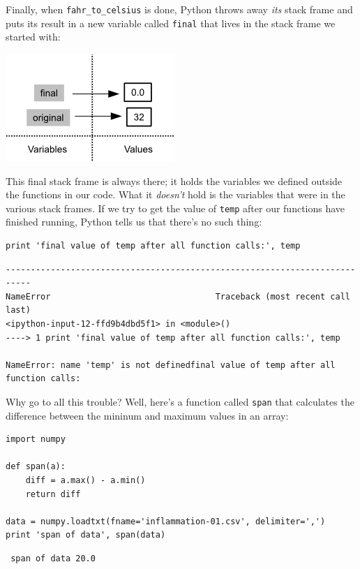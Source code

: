 \documentclass[]{book}
\begin{document}
Finally, when \texttt{fahr\_to\_celsius} is done, Python throws away
\emph{its} stack frame and puts its result in a new variable called
\texttt{final} that lives in the stack frame we started with:

\includegraphics{novice/python/img/python-call-stack-07.png}

This final stack frame is always there; it holds the variables we
defined outside the functions in our code. What it \emph{doesn't} hold
is the variables that were in the various stack frames. If we try to get
the value of \texttt{temp} after our functions have finished running,
Python tells us that there's no such thing:

\begin{verbatim}
print 'final value of temp after all function calls:', temp
\end{verbatim}

\begin{verbatim}
---------------------------------------------------------------------------
NameError                                 Traceback (most recent call last)
<ipython-input-12-ffd9b4dbd5f1> in <module>()
----> 1 print 'final value of temp after all function calls:', temp

NameError: name 'temp' is not definedfinal value of temp after all function calls:
\end{verbatim}

Why go to all this trouble? Well, here's a function called \texttt{span}
that calculates the difference between the mininum and maximum values in
an array:

\begin{verbatim}
import numpy

def span(a):
    diff = a.max() - a.min()
    return diff

data = numpy.loadtxt(fname='inflammation-01.csv', delimiter=',')
print 'span of data', span(data)
\end{verbatim}

\begin{verbatim}
 span of data 20.0
\end{verbatim}
\end{document}
